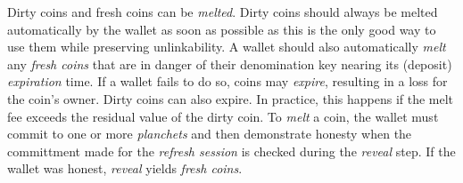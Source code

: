 Dirty coins and fresh coins can be {\em melted}.  Dirty coins should always be
melted automatically by the wallet as soon as possible as this is the only
good way to use them while preserving unlinkability.  A wallet should also
automatically {\em melt} any {\em fresh coins} that are in danger of their
denomination key nearing its (deposit) {\em expiration} time. If a wallet
fails to do so, coins may {\em expire}, resulting in a loss for the coin's
owner.  Dirty coins can also expire. In practice, this happens if the melt fee
exceeds the residual value of the dirty coin.  To {\em melt} a coin, the
wallet must commit to one or more {\em planchets} and then demonstrate honesty
when the committment made for the {\em refresh session} is checked during the
{\em reveal} step. If the wallet was honest, {\em reveal} yields {\em fresh
  coins}.

